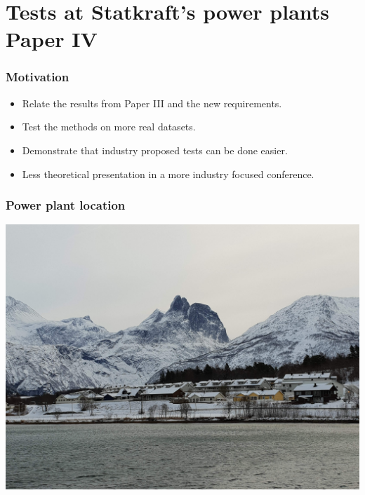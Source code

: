 \section{Tests at Statkraft's power plants Paper IV}
\begin{frame}
	\frametitle{Motivation}
	\begin{itemize}
		\item Relate the results from Paper III and the new requirements.
		\item Test the methods on more real datasets.
		\item Demonstrate that industry proposed tests can be done easier.
		\item Less theoretical presentation in a more industry focused conference.
	\end{itemize}
\end{frame}
\begin{frame}
	\frametitle{Power plant location}
	\includegraphics[width=\textwidth]{./pictures/romsdalshorn.jpg}
\end{frame}
